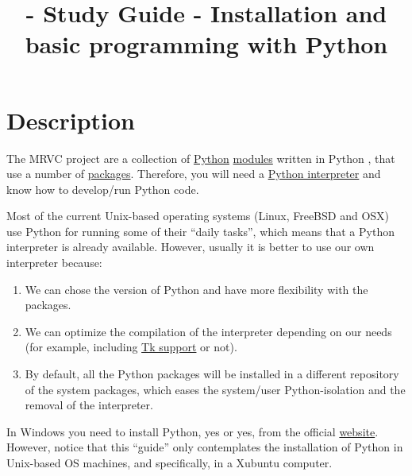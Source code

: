 
\title{\SM{} - Study Guide - Installation and basic programming with Python}

\maketitle

\tableofcontents

\section{Description}

The MRVC project \cite{MRVC} are a collection of
\href{https://www.python.org/}{Python}
\href{https://docs.python.org/3/tutorial/modules.html#modules}{modules}
written in Python \cite{python}, that use a number of
\href{https://docs.python.org/3/tutorial/modules.html#packages}{packages}. Therefore,
you will need a
\href{https://docs.python.org/3/tutorial/interpreter.html}{Python
  interpreter} and know how to develop/run Python code.

Most of the current Unix-based operating systems (Linux, FreeBSD and
OSX) use Python for running some of their ``daily tasks'', which means
that a Python interpreter is already available. However, usually it is
better to use our own interpreter because:

\begin{enumerate}

\item We can chose the version of Python and have more flexibility
  with the packages.

\item We can optimize the compilation of the interpreter depending on
  our needs (for example, including
  \href{https://wiki.python.org/moin/TkInter}{Tk support} or not).

\item By default, all the Python packages will be installed in a
  different repository of the system packages, which eases the
  system/user Python-isolation and the removal of the interpreter.

\end{enumerate}

In Windows you need to install Python, yes or yes, from the official
\href{https://www.python.org/downloads/}{website}. However, notice
that this ``guide'' only contemplates the installation of Python in
Unix-based OS machines, and specifically, in a Xubuntu computer.

